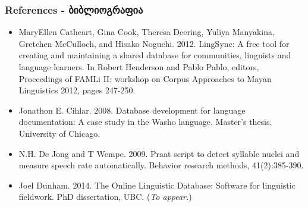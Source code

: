\documentclass{beamer}
\begin{document}
\begin{frame}
\frametitle{References - ბიბლიოგრაფია}
\tiny
\begin{itemize}
\item MaryEllen Cathcart, Gina Cook, Theresa Deering, Yuliya Manyakina, Gretchen McCulloch, and Hisako Noguchi. 2012. LingSync: A free tool for creating and maintaining a shared database for communities, linguists and language learners. In Robert Henderson and Pablo Pablo, editors, Proceedings of FAMLi II: workshop on Corpus Approaches to Mayan Linguistics 2012, pages 247-250.
\item Jonathon E. Cihlar. 2008. Database development for language documentation: A case study in the Washo language. Master's thesis, University of Chicago.
\item N.H. De Jong and T Wempe. 2009. Praat script to detect syllable nuclei and measure speech rate automatically. Behavior research methods, 41(2):385-390.
\item Joel Dunham. 2014. The Online Linguistic Database: Software for linguistic fieldwork. PhD dissertation, UBC. (\textit{To appear.})

\end{itemize}
\end{frame}
\end{document}
